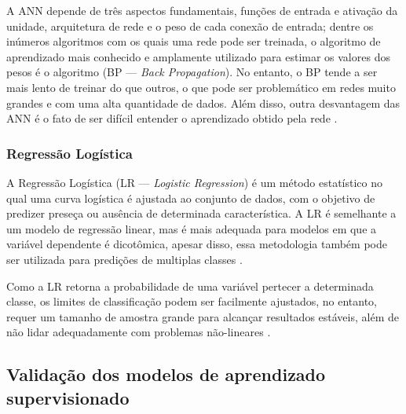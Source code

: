 \documentclass[
	12pt,				%
	oneside,			%
	a4paper,			%
	english,			%
	brazil				%
	]{abntex2ppgsi}
\begin{document}
A ANN depende de três aspectos fundamentais, funções de entrada e ativação da unidade, arquitetura de rede e o peso de cada conexão de entrada; dentre os inúmeros  algoritmos com os quais uma rede pode ser treinada, o algoritmo de aprendizado mais conhecido e amplamente utilizado para estimar os valores dos pesos é o algoritmo (BP --- \textit{Back Propagation}). No entanto, o BP tende a ser mais lento de treinar do que outros, o que pode ser problemático em redes muito grandes e com uma alta quantidade de dados. Além disso, outra desvantagem das ANN é o fato de ser difícil entender o aprendizado obtido pela rede \cite{kotsiantis2006machine, singh2016review}.

\subsubsection{Regressão Logística}

A Regressão Logística  (LR --- \textit{Logistic Regression}) é um método estatístico no qual uma curva logística é ajustada ao conjunto de dados, com o objetivo de predizer preseça ou ausência de determinada característica. A LR é semelhante a um modelo de regressão linear, mas é mais adequada para modelos em que a variável dependente é dicotômica, apesar disso, essa metodologia também pode ser utilizada para predições de multiplas classes \cite{schein2007active, kurt2008comparing, singh2016review}. 

Como a LR retorna a probabilidade de uma variável pertecer a determinada classe, os limites de classificação podem ser facilmente ajustados, no entanto, requer um tamanho de amostra grande para alcançar resultados estáveis, além de não lidar adequadamente com problemas não-lineares \cite{khemphila2010comparing, singh2016review}.

\subsection{Validação dos modelos de aprendizado supervisionado}
\label{modelValidation}
\end{document}
